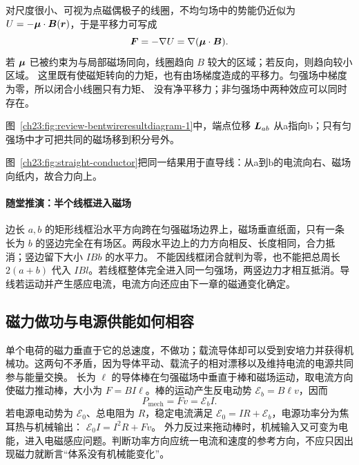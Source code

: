 {对尺度很小、可视为点磁偶极子的线圈，不均匀场中的势能仍近似为
$U=-\bm{\mu}\cdot\bm{B}(\bm{r})$，于是平移力可写成
\begin{equation}
  \bm{F}=-\nabla U=\nabla(\bm{\mu}\cdot\bm{B}).
\end{equation}
若 $\bm{\mu}$ 已被约束为与局部磁场同向，线圈趋向 $B$ 较大的区域；若反向，则趋向较小区域。
这里既有使磁矩转向的力矩，也有由场梯度造成的平移力。匀强场中梯度为零，所以闭合小线圈只有力矩、
没有净平移力；非匀强场中两种效应可以同时存在。

图~\ref{ch23:fig:review-bentwireresultdiagram-1}中，端点位移 $\bm{L}_{ab}$ 从a指向b；只有匀强场中才可把共同的磁场移到积分号外。
\par\noindent\begin{minipage}{\linewidth}
\bentWireResultDiagram
{}
\end{minipage}\par\medskip
图~\ref{ch23:fig:straight-conductor}把同一结果用于直导线：从a到b的电流向右、磁场向纸内，故合力向上。
\par\noindent\begin{minipage}{\linewidth}
\straightConductorDiagram
{}
\end{minipage}\par\medskip


\paragraph{随堂推演：半个线框进入磁场}
边长 $a,b$ 的矩形线框沿水平方向跨在匀强磁场边界上，磁场垂直纸面，只有一条长为 $b$ 的竖边完全在有场区。两段水平边上的力方向相反、长度相同，合力抵消；竖边留下大小 $IBb$ 的水平力。
不能因线框闭合就判为零，也不能把总周长 $2(a+b)$ 代入 $IBl$。若线框整体完全进入同一匀强场，两竖边力才相互抵消。导线若运动并产生感应电流，电流方向还应由下一章的磁通变化确定。


\subsection{磁力做功与电源供能如何相容}
单个电荷的磁力垂直于它的总速度，不做功；载流导体却可以受到安培力并获得机械功。这两句不矛盾，因为导体平动、载流子的相对漂移以及维持电流的电源共同参与能量交换。
长为 $\ell$ 的导体棒在匀强磁场中垂直于棒和磁场运动，取电流方向使磁力推动棒，大小为 $F=BI\ell$。棒的运动产生反电动势 $\mathcal E_b=B\ell v$，因而
\[
 P_{\mathrm{mech}}=Fv=\mathcal E_b I.
\]
若电源电动势为 $\mathcal E_0$、总电阻为 $R$，稳定电流满足
$\mathcal E_0=IR+\mathcal E_b$，电源功率分为焦耳热与机械输出：
$\mathcal E_0I=I^2R+Fv$。
外力反过来拖动棒时，机械输入又可变为电能，进入电磁感应问题。判断功率方向应统一电流和速度的参考方向，不应只因出现磁力就断言“体系没有机械能变化”。


}
